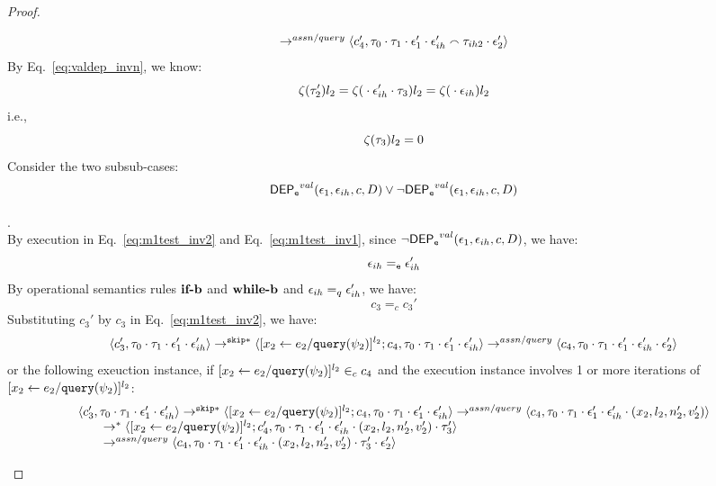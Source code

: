 \begin{proof}
\begin{case}
\begin{subcase}
\begin{equation}
\begin{array}{l}
  \rightarrow^{assn/query} 
  \langle {c}_4',  \mathtt{\tau}_0 \cdot \mathtt{\tau}_1 \cdot \mathtt{\epsilon}_1' \cdot \mathtt{\epsilon}_{ih}' \smallfrown \mathtt{\tau}_{ih2} \cdot \mathtt{\epsilon}_2' \rangle 
\end{array}
\end{equation}
By Eq.~\ref{eq:valdep_invn}, we know:
%
\[
\mathtt{\zeta}(\mathtt{\tau}_2') l_2  = \mathtt{\zeta}({} \cdot {} \mathtt{\epsilon}_{ih}' \cdot \mathtt{\tau}_3) l_2 = \mathtt{\zeta}({} \cdot {} \mathtt{\epsilon}_{ih}) l_2 
 \]
i.e., 
\[
  \mathtt{\zeta}(\mathtt{\tau}_3) l_2 = 0
\]
Consider the two subsub-cases: 
%
$$
\mathsf{DEP_{\mathtt{e}}}^{val}(\mathtt{\epsilon}_1, \mathtt{\epsilon}_{ih}, c, D) \lor \neg\mathsf{DEP_{\mathtt{e}}}^{val}(\mathtt{\epsilon}_1, \mathtt{\epsilon}_{ih}, c, D)
$$
%
\begin{subsubcase}
.
\label{case:valdep_ihtestnodep}
\\
By execution in Eq.~\ref{eq:m1test_inv2} and Eq.~\ref{eq:m1test_inv1}, 
since $\neg\mathsf{DEP_{\mathtt{e}}}^{val}(\mathtt{\epsilon}_1, \mathtt{\epsilon}_{ih}, c, D)$, we have:
\[
  \mathtt{\epsilon}_{ih} =_{\mathtt{e}} \mathtt{\epsilon}_{ih}'
\]
By operational semantics rules $\rname{if-b}$ and $\rname{while-b}$ and $\mathtt{\epsilon}_{ih} =_q \mathtt{\epsilon}_{ih}'$, we have:
\[
 c_3 =_c c_3'
\]
%
Substituting $c_3'$ by $c_3$ in Eq.~\ref{eq:m1test_inv2}, we have:
\[
  \langle c_3', \mathtt{\tau}_0 \cdot \mathtt{\tau}_1 \cdot \mathtt{\epsilon}_1' \cdot \mathtt{\epsilon}_{ih}' \rangle 
  \rightarrow^{\mathtt{skip}*} 
  \langle [\mathrel{ {x}_2 \leftarrow e_2 / {\tt query}(\psi_2) }]^{l_2};{c}_4, 
  \mathtt{\tau}_0 \cdot \mathtt{\tau}_1 \cdot \mathtt{\epsilon}_1' \cdot \mathtt{\epsilon}_{ih}' \rangle
  \rightarrow^{assn/query} 
  \langle {c}_4,  \mathtt{\tau}_0 \cdot \mathtt{\tau}_1 \cdot \mathtt{\epsilon}_1' \cdot \mathtt{\epsilon}_{ih}' \cdot \mathtt{\epsilon}_2' \rangle 
\]
%
or the following exeuction instance, 
if $[\mathrel{ {x}_2 \leftarrow e_2 / {\tt query}(\psi_2) }]^{l_2} \in_c c_4$ and 
the execution instance involves 1 or more iterations of $[\mathrel{ {x}_2 \leftarrow e_2 / {\tt query}(\psi_2) }]^{l_2}$:
%
\[
 \begin{array}{l}
  \langle c_3', \mathtt{\tau}_0 \cdot \mathtt{\tau}_1 \cdot \mathtt{\epsilon}_1' \cdot \mathtt{\epsilon}_{ih}' \rangle 
  \rightarrow^{\mathtt{skip}*} 
  \langle [\mathrel{ {x}_2 \leftarrow e_2 / {\tt query}(\psi_2) }]^{l_2};{c}_4, 
  \mathtt{\tau}_0 \cdot \mathtt{\tau}_1 \cdot \mathtt{\epsilon}_1' \cdot \mathtt{\epsilon}_{ih}' \rangle
  \rightarrow^{assn/query} 
  \langle {c}_4,  \mathtt{\tau}_0 \cdot \mathtt{\tau}_1 \cdot \mathtt{\epsilon}_1' \cdot \mathtt{\epsilon}_{ih}' \cdot (x_2, l_2, n_2', v_2') \rangle 
  \\ \qquad 
  \rightarrow^{*} 
  \langle [\mathrel{ {x}_2 \leftarrow e_2 / {\tt query}(\psi_2) }]^{l_2};{c}_4', 
  \mathtt{\tau}_0 \cdot \mathtt{\tau}_1 \cdot \mathtt{\epsilon}_1' \cdot \mathtt{\epsilon}_{ih}'\cdot (x_2, l_2, n_2', v_2') \cdot \mathtt{\tau}_3' \rangle
  \\ \qquad 
  \rightarrow^{assn/query} 
  \langle {c}_4,  \mathtt{\tau}_0 \cdot \mathtt{\tau}_1 \cdot \mathtt{\epsilon}_1' \cdot \mathtt{\epsilon}_{ih}' \cdot (x_2, l_2, n_2', v_2')\cdot \mathtt{\tau}_3' \cdot \mathtt{\epsilon}_2' \rangle 

\end{array}\]
\end{subsubcase}
\end{subcase}
\end{case}
\end{proof}
